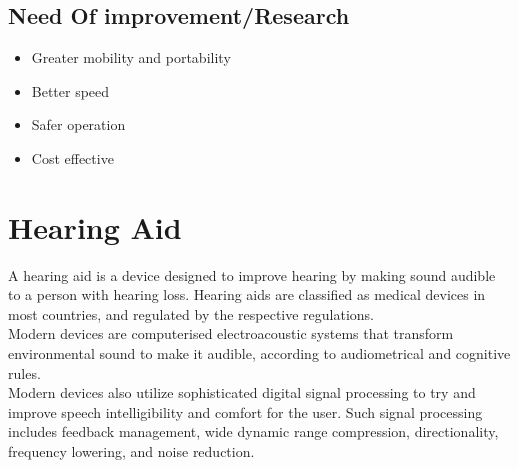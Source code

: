 \documentclass[12pt]{article}
\begin{document}
\subsection{Need Of improvement/Research}
\begin{itemize}
\item Greater mobility and portability
\item Better speed
\item Safer operation
\item Cost effective
\end{itemize}
\clearpage

\section{Hearing Aid}

A hearing aid is a device designed to improve hearing by making sound audible to a person with hearing loss. Hearing aids are classified as medical devices in most countries, and regulated by the respective regulations.\\ 
Modern devices are computerised electroacoustic systems that transform environmental sound to make it audible, according to audiometrical and cognitive rules.\\ 
Modern devices also utilize sophisticated digital signal processing to try and improve speech intelligibility and comfort for the user. Such signal processing includes feedback management, wide dynamic range compression, directionality, frequency lowering, and noise reduction.
\end{document}
